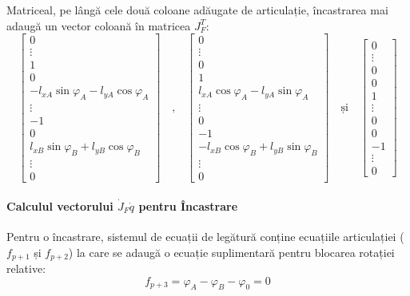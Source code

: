 \documentclass[12pt, a4paper]{article}
\begin{document}
Matriceal, pe lângă cele două coloane adăugate de articulație, încastrarea mai adaugă un vector coloană în matricea $J_F^T$:
\begin{equation}
    \begin{bmatrix}
        0 \\ \vdots \\ 1 \\ 0 \\ -l_{xA}\sin\varphi_A - l_{yA}\cos\varphi_A \\ \vdots \\ -1 \\ 0 \\ l_{xB}\sin\varphi_B + l_{yB}\cos\varphi_B \\ \vdots \\ 0
    \end{bmatrix}
    \quad \text{,} \quad
    \begin{bmatrix}
        0 \\ \vdots \\ 0 \\ 1 \\ l_{xA}\cos\varphi_A - l_{yA}\sin\varphi_A \\ \vdots \\ 0 \\ -1 \\ -l_{xB}\cos\varphi_B + l_{yB}\sin\varphi_B \\ \vdots \\ 0
    \end{bmatrix}
    \quad \text{și} \quad
    \begin{bmatrix}
        0 \\ \vdots \\ 0 \\ 0 \\ 1 \\ \vdots \\ 0 \\ 0 \\ -1 \\ \vdots \\ 0
    \end{bmatrix}
\end{equation}

\paragraph{Calculul vectorului $\dot{J}_F \dot{q}$ pentru Încastrare}

Pentru o încastrare, sistemul de ecuații de legătură conține ecuațiile articulației ($f_{p+1}$ și $f_{p+2}$) la care se adaugă o ecuație suplimentară pentru blocarea rotației relative:
\begin{equation}
    f_{p+3} = \varphi_A - \varphi_B - \varphi_0 = 0
\end{equation}
\end{document}
